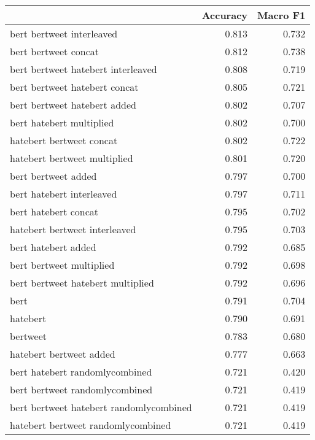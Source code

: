 \begin{tabular}{lrr}
\toprule
{} &  Accuracy &  Macro F1 \\
\midrule
bert bertweet interleaved                &     0.813 &     0.732 \\
bert bertweet concat                     &     0.812 &     0.738 \\
bert bertweet hatebert interleaved       &     0.808 &     0.719 \\
bert bertweet hatebert concat            &     0.805 &     0.721 \\
bert bertweet hatebert added             &     0.802 &     0.707 \\
bert hatebert multiplied                 &     0.802 &     0.700 \\
hatebert bertweet concat                 &     0.802 &     0.722 \\
hatebert bertweet multiplied             &     0.801 &     0.720 \\
bert bertweet added                      &     0.797 &     0.700 \\
bert hatebert interleaved                &     0.797 &     0.711 \\
bert hatebert concat                     &     0.795 &     0.702 \\
hatebert bertweet interleaved            &     0.795 &     0.703 \\
bert hatebert added                      &     0.792 &     0.685 \\
bert bertweet multiplied                 &     0.792 &     0.698 \\
bert bertweet hatebert multiplied        &     0.792 &     0.696 \\
bert                                     &     0.791 &     0.704 \\
hatebert                                 &     0.790 &     0.691 \\
bertweet                                 &     0.783 &     0.680 \\
hatebert bertweet added                  &     0.777 &     0.663 \\
bert hatebert randomlycombined           &     0.721 &     0.420 \\
bert bertweet randomlycombined           &     0.721 &     0.419 \\
bert bertweet hatebert randomlycombined  &     0.721 &     0.419 \\
hatebert bertweet randomlycombined       &     0.721 &     0.419 \\
\bottomrule
\end{tabular}
